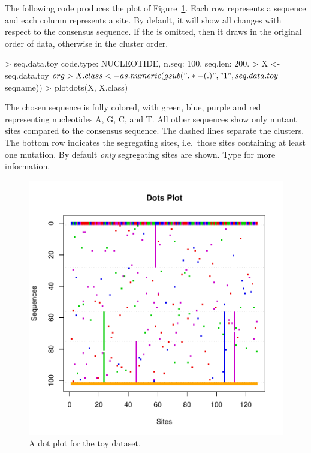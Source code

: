 The following code produces the plot of Figure~\ref{fig:toydots}.
Each row represents a sequence and each column represents a site.
By default, it will show all changes with respect to the consensus sequence.
If the  is omitted, then it draws in the original order of data,
otherwise in the cluster order.
\begin{Code}
> seq.data.toy
code.type: NUCLEOTIDE, n.seq: 100, seq.len: 200.
> X <- seq.data.toy$org
> X.class <- as.numeric(gsub(".*-(.)", "\\1", seq.data.toy$seqname))
> plotdots(X, X.class)
\end{Code}

The chosen sequence is fully colored, with green, blue, purple and red representing 
nucleotides A, G, C, and T.
All other sequences show only mutant sites compared to the consensus sequence.
The dashed lines separate the clusters.
The bottom row indicates the segregating sites, i.e.\ those sites containing
at least one mutation.
By default {\it only} segregating sites are shown.
Type  for more information.
\begin{figure}[h]
\begin{center}
\includegraphics[width=5.0in]{./phyclust-include/f-toydots}
\caption{A dot plot for the toy dataset.}
\label{fig:toydots}
\end{center}
\end{figure}

